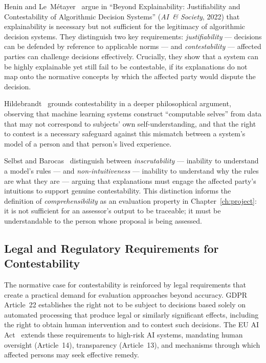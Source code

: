 Henin and Le~M\'{e}tayer~\cite{henin2022} argue in ``Beyond Explainability:
Justifiability and Contestability of Algorithmic Decision Systems''
(\emph{AI~\& Society}, 2022) that explainability is necessary but not
sufficient for the legitimacy of algorithmic decision systems.  They
distinguish two key requirements: \emph{justifiability} --- decisions can be
defended by reference to applicable norms --- and \emph{contestability} ---
affected parties can challenge decisions effectively.  Crucially, they show
that a system can be highly explainable yet still fail to be contestable, if
its explanations do not map onto the normative concepts by which the affected
party would dispute the decision.

Hildebrandt~\cite{hildebrandt2019agonistic} grounds contestability in a
deeper philosophical argument, observing that machine learning systems
construct ``computable selves'' from data that may not correspond to subjects'
own self-understanding, and that the right to contest is a necessary safeguard
against this mismatch between a system's model of a person and that person's
lived experience.

Selbst and Barocas~\cite{selbst2018} distinguish between \emph{inscrutability}
--- inability to understand a model's rules --- and \emph{non-intuitiveness}
--- inability to understand why the rules are what they are --- arguing that
explanations must engage the affected party's intuitions to support genuine
contestability.  This distinction informs the definition of
\emph{comprehensibility} as an evaluation property in Chapter~\ref{ch:project}:
it is not sufficient for an assessor's output to be traceable; it must be
understandable to the person whose proposal is being assessed.

\subsection{Legal and Regulatory Requirements for Contestability}

The normative case for contestability is reinforced by legal requirements that
create a practical demand for evaluation approaches beyond accuracy.  GDPR
Article~22 establishes the right not to be subject to decisions based solely
on automated processing that produce legal or similarly significant effects,
including the right to obtain human intervention and to contest such decisions.
The EU AI Act~\cite{euaiact2024} extends these requirements to high-risk AI
systems, mandating human oversight (Article~14), transparency (Article~13),
and mechanisms through which affected persons may seek effective remedy.


